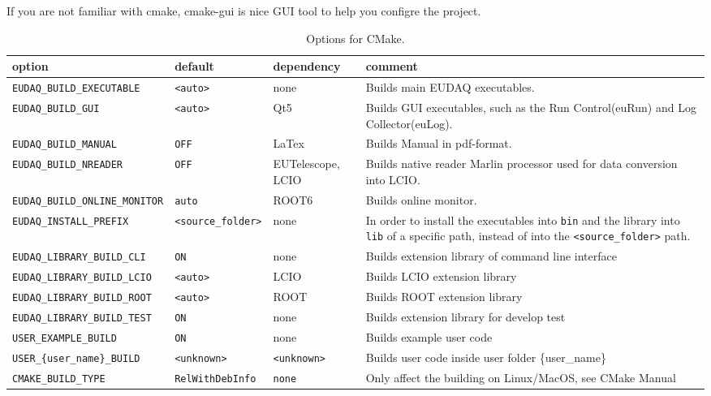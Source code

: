 If you are not familiar with cmake, cmake-gui is nice GUI tool to help you configre the project.

\begin{table}[!h]
{\footnotesize
\begin{tabular}{l|l|p{2cm}|p{5.5cm}}
option &  default &  dependency & comment \\
\hline
\texttt{EUDAQ\_BUILD\_EXECUTABLE} &  \texttt{<auto>} & none & Builds main EUDAQ executables.\\
\texttt{EUDAQ\_BUILD\_GUI} & \texttt{<auto>} & Qt5 & Builds GUI executables, such as the Run Control(euRun) and Log Collector(euLog).\\
\texttt{EUDAQ\_BUILD\_MANUAL} & \texttt{OFF} & LaTex &  Builds Manual in pdf-format.  \\
\texttt{EUDAQ\_BUILD\_NREADER} & \texttt{OFF} & EUTelescope, LCIO &  Builds native reader Marlin processor used for data conversion into LCIO.\\
\texttt{EUDAQ\_BUILD\_ONLINE\_MONITOR} & \texttt{auto} & ROOT6 &  Builds online monitor.  \\
\texttt{EUDAQ\_INSTALL\_PREFIX} & \texttt{<source\_folder>} & none & In order to install the executables into \texttt{bin} and the library into \texttt{lib} of a specific path, instead of into the \texttt{<source\_folder>} path.\\
\texttt{EUDAQ\_LIBRARY\_BUILD\_CLI} & \texttt{ON} & none & Builds extension library of command line interface\\
\texttt{EUDAQ\_LIBRARY\_BUILD\_LCIO} & \texttt{<auto>} & LCIO & Builds LCIO extension library\\
\texttt{EUDAQ\_LIBRARY\_BUILD\_ROOT} & \texttt{<auto>} & ROOT & Builds ROOT extension library\\
\texttt{EUDAQ\_LIBRARY\_BUILD\_TEST} & \texttt{ON} & none & Builds extension library for develop test\\
\texttt{USER\_EXAMPLE\_BUILD} & \texttt{ON} & none & Builds example user code\\
\texttt{USER\_\{user\_name\}\_BUILD} & \texttt{<unknown>} & \texttt{<unknown>} & Builds user code inside user folder \{user\_name\}\\
\texttt{CMAKE\_BUILD\_TYPE} & \texttt{RelWithDebInfo} & \texttt{none} & Only affect the building on Linux/MacOS, see CMake Manual\\
\end{tabular}
\caption{Options for CMake.}
\label{tab:cmakeoptions}
}
\end{table}

